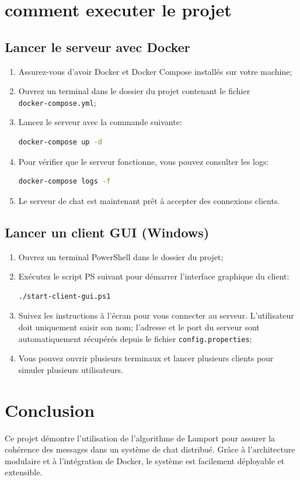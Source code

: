 \documentclass[a4paper,12pt]{article}
\begin{document}
\section{comment executer le projet}

\subsection{Lancer le serveur avec Docker}
\begin{enumerate}
    \item Assurez-vous d'avoir Docker et Docker Compose installés sur votre machine;
    \item Ouvrez un terminal dans le dossier du projet contenant le fichier \\\texttt{docker-compose.yml};
    \item Lancez le serveur avec la commande suivante:
    \begin{lstlisting}[language=bash]
docker-compose up -d
    \end{lstlisting}
    \item Pour vérifier que le serveur fonctionne, vous pouvez consulter les logs:
    \begin{lstlisting}[language=bash]
docker-compose logs -f
    \end{lstlisting}
    \item Le serveur de chat est maintenant prêt à accepter des connexions clients.
\end{enumerate}

\subsection{Lancer un client GUI (Windows)}
\begin{enumerate}
    \item Ouvrez un terminal PowerShell dans le dossier du projet;
    \item Exécutez le script PS suivant pour démarrer l'interface graphique du client:
    \begin{lstlisting}[language=bash]
./start-client-gui.ps1
    \end{lstlisting}
    \item Suivez les instructions à l'écran pour vous connecter au serveur. L'utilisateur doit uniquement saisir son nom; l'adresse et le port du serveur sont automatiquement récupérés depuis le fichier \texttt{config.properties};
    \item Vous pouvez ouvrir plusieurs terminaux et lancer plusieurs clients pour simuler plusieurs utilisateurs.
\end{enumerate}

\section{Conclusion}
Ce projet démontre l'utilisation de l'algorithme de Lamport pour assurer la cohérence des messages dans un système de chat distribué. Grâce à l'architecture modulaire et à l'intégration de Docker, le système est facilement déployable et extensible.
\end{document}
